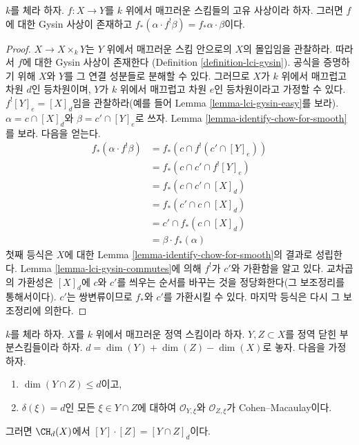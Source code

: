 \begin{lemma}
\label{lemma-projection-formula}
$k$를 체라 하자. $f : X \to Y$를 $k$ 위에서 매끄러운 스킴들의 고유
사상이라 하자. 그러면 $f$에 대한 Gysin 사상이 존재하고
$f_*(\alpha \cdot f^!\beta) = f_*\alpha \cdot \beta$이다.
\end{lemma}

\begin{proof}
$X \to X \times_k Y$는 $Y$ 위에서 매끄러운 스킴 안으로의 $X$의
몰입임을 관찰하라. 따라서 $f$에 대한 Gysin 사상이 존재한다
(Definition \ref{definition-lci-gysin}). 공식을 증명하기 위해 $X$와
$Y$를 그 연결 성분들로 분해할 수 있다. 그러므로 $X$가 $k$ 위에서
매끄럽고 차원 $d$인 등차원이며, $Y$가 $k$ 위에서 매끄럽고 차원
$e$인 등차원이라고 가정할 수 있다.
$f^![Y]_e = [X]_d$임을 관찰하라(예를 들어 Lemma
\ref{lemma-lci-gysin-easy}를 보라).
$\alpha = c \cap [X]_d$와 $\beta = c' \cap [Y]_e$로 쓰자.
Lemma \ref{lemma-identify-chow-for-smooth}를 보라. 다음을 얻는다.
\begin{align*}
f_*(\alpha \cdot f^!\beta)
& =
f_*(c \cap f^!(c' \cap [Y]_e)) \\
& =
f_*(c \cap c' \cap f^![Y]_e) \\
& =
f_*(c \cap c' \cap [X]_d) \\
& =
f_*(c' \cap c \cap [X]_d) \\
& =
c' \cap f_*(c \cap [X]_d) \\
& =
\beta \cdot f_*(\alpha)
\end{align*}
첫째 등식은 $X$에 대한 Lemma
\ref{lemma-identify-chow-for-smooth}의 결과로 성립한다. Lemma
\ref{lemma-lci-gysin-commutes}에 의해 $f^!$가 $c'$와 가환함을 알고
있다. 교차곱의 가환성은 $[X]_d$에 $c$와 $c'$를 씌우는 순서를 바꾸는
것을 정당화한다(그 보조정리를 통해서이다). $c'$는 쌍변류이므로
$f_*$와 $c'$를 가환시킬 수 있다. 마지막 등식은 다시 그 보조정리에
의한다.
\end{proof}

\begin{lemma}
\label{lemma-intersect-properly}
$k$를 체라 하자. $X$를 $k$ 위에서 매끄러운 정역 스킴이라 하자.
$Y, Z \subset X$를 정역 닫힌 부분스킴들이라 하자.
$d = \dim(Y) + \dim(Z) - \dim(X)$로 놓자. 다음을 가정하자.
\begin{enumerate}
\item $\dim(Y \cap Z) \leq d$이고,
\item $\delta(\xi) = d$인 모든 $\xi \in Y \cap Z$에 대하여
$\mathcal{O}_{Y, \xi}$와 $\mathcal{O}_{Z, \xi}$가 Cohen--Macaulay이다.
\end{enumerate}
그러면 $\CH_d(X)$에서 $[Y] \cdot [Z] = [Y \cap Z]_d$이다.
\end{lemma}

